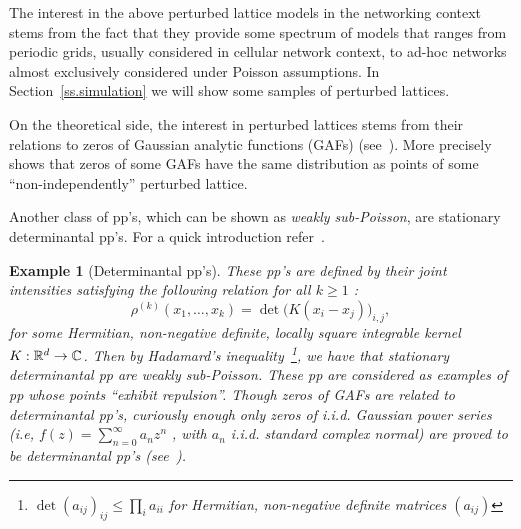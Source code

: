 \documentclass[conference]{IEEEtran}
\newtheorem{ex}[Th]{Example}
\begin{document}
The interest in the above perturbed lattice models
in the networking context 
stems from the fact that they provide some spectrum of models 
that ranges from periodic grids, usually considered in cellular network
context, to ad-hoc networks almost exclusively considered under Poisson
assumptions. In Section~\ref{ss.simulation} we will show some samples
of perturbed lattices.

On the theoretical side, the interest in  perturbed lattices 
stems from their relations to
zeros of Gaussian analytic functions (GAFs)
(see~\cite{Peres05,Sodin04}).
 More precisely~\cite{Sodin06} shows that 
zeros of some  GAFs have the same distribution as points of some
 ``non-independently'' perturbed lattice. 

Another class of pp's, which can be shown as {\em weakly sub-Poisson}, 
are stationary determinantal pp's. For a quick introduction
refer~\cite{Ben06}. 
\begin{ex}[Determinantal pp's] 
These pp's are 
defined by their joint intensities satisfying the following relation for all $k \geq 1$ :
$$ \rho^{(k)}(x_1,\ldots,x_k) = \det \Big (K(x_i-x_j) \Big )_{i,j}, $$
for some Hermitian, non-negative definite, locally square integrable
kernel $K : {\Bbb{R}}^d \to \mathbb{C}$. Then by Hadamard's inequality~\footnote{
$\det( a_{ij})_{ij} \leq \prod_i a_{ii}$ for Hermitian,
non-negative definite matrices $(a_{ij})$}, 
we have that {\em stationary determinantal
pp are weakly sub-Poisson}. These pp are considered as examples of pp
whose points ``exhibit repulsion''. 
Though zeros of GAFs are related to determinantal pp's, curiously enough only
zeros of i.i.d. Gaussian power series (i.e, $f(z) =
\sum_{n=0}^{\infty}a_n z^n$ , with $a_n$ i.i.d. standard complex
normal) are proved to be  determinantal pp's (see~\cite{Peres05}).    
\end{ex}
\end{document}
